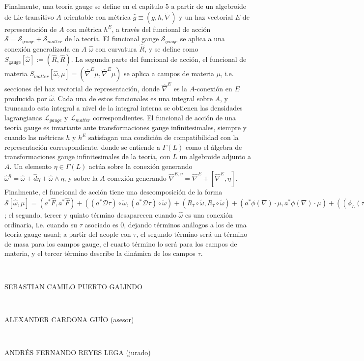 \documentclass{article}
\begin{document}
Finalmente, una teoría gauge se define en el capítulo $5$ a partir de un algebroide de Lie transitivo $A$ orientable con métrica $\hat g \equiv (g, h, \tilde \nabla)$ y un haz vectorial $E$ de representación de $A$ con métrica $h^E$, a través del funcional de acción $\mathcal S = \mathcal S_{gauge} + \mathcal S_{matter}$ de la teoría. El funcional gauge $\mathcal S_{gauge}$ se aplica a una conexión generalizada en $A$ $\hat \omega$ con curvatura $\hat R$, y se define como $S_\text{gauge}[\hat \omega] := (\hat R, \hat R)$. La segunda parte del funcional de acción, el funcional de materia $S_{matter}[\hat \omega, \mu] = (\hat \nabla^E \mu, \hat \nabla^E \mu)$ se aplica a campos de materia $\mu$, i.e. secciones del haz vectorial de representación, donde $\hat \nabla^E$ es la $A$-conexión en $E$ producida por $\hat \omega$. Cada una de estos funcionales es una integral sobre $A$, y truncando esta integral a nivel de la integral interna se obtienen las densidades lagrangianas $\mathcal L_{gauge}$ y $\mathcal L_{matter}$ correspondientes. El funcional de acción de una teoría gauge es invariante ante transformaciones gauge infinitesimales, siempre y cuando las métricas $h$ y $h^E$ satisfagan una condición de compatibilidad con la representación correspondiente, donde se entiende a $\Gamma(L)$ como el álgebra de transformaciones gauge infinitesimales de la teoría, con $L$ un algebroide adjunto a $A$. Un elemento $\eta \in \Gamma(L)$ actúa sobre la conexión generando $\hat \omega^\eta = \hat \omega + \hat d\eta + \hat \omega \wedge \eta$, y sobre la $A$-conexión generando $\hat \nabla^{E, \eta} = \hat \nabla^E + [\hat \nabla^E, \eta]$. Finalmente, el funcional de acción tiene una descomposición de la forma $\mathcal S[\hat \omega, \mu] = (a^* \hat F, a^* \hat F) + ((a^* \mathcal D \tau) \circ \tilde \omega, (a^* \mathcal D \tau) \circ \tilde \omega) + (R_\tau \circ \tilde \omega, R_\tau \circ \tilde \omega) + (a^* \phi(\nabla)\cdot \mu, a^* \phi(\nabla)\cdot \mu) + ((\phi_L(\tau)\mu)\circ \tilde \omega, (\phi_L(\tau)\mu)\circ \tilde \omega)$; el segundo, tercer y quinto término desaparecen cuando $\hat \omega$ es una conexión ordinaria, i.e. cuando su $\tau$ asociado es $0$, dejando términos análogos a los de una teoría gauge usual; a partir del acople con $\tau$, el segundo término será un término de masa para los campos gauge, el cuarto término lo será para los campos de materia, y el tercer término describe la dinámica de los campos $\tau$.



\vspace{\fill}


\parbox{.4\textwidth}{%
\underline{\hspace{7cm}}\\
\raggedright SEBASTIAN CAMILO PUERTO GALINDO
}
\bigskip
\bigskip
\bigskip


\parbox{.4\textwidth}{%
\underline{\hspace{7cm}}\\
\raggedright ALEXANDER CARDONA GUÍO (asesor)
}
\hspace*{\fill}
\parbox{.4\textwidth}{%
\underline{\hspace{7cm}}\\
\raggedright ANDRÉS FERNANDO REYES LEGA (jurado)
}
\end{document}
